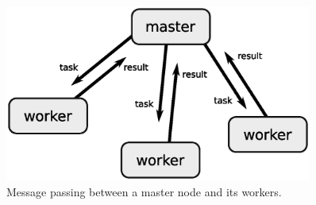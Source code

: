 \begin{figure}[htb]
  \centering
    \includegraphics[width=0.9\textwidth]{./../eps/master-worker-paradigm.eps}
  \caption{Message passing between a master node and its workers.}
  \label{fig:master-worker-paradigm}
\end{figure}


